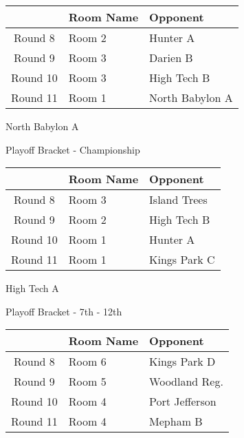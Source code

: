\documentclass{article}%
\begin{document}
\vspace*{4pt}%
%
\begin{tabularx}{\textwidth}{|c|Y|Y|}%
\hline%
&Room Name&Opponent\\%
\hline%
Round 8&Room 2&Hunter A\\%
Round 9&Room 3&Darien B\\%
Round 10&Room 3&High Tech B\\%
Round 11&Room 1&North Babylon A\\%
\hline%
\end{tabularx}%
\vspace*{80pt}%
\linebreak%
\newpage%
\begin{center}%
\begin{Huge}%
North Babylon A%
\end{Huge}%
\vspace*{12pt}%
\linebreak%
\begin{Large}%
Playoff Bracket {-} Championship%
\end{Large}%
\end{center}%
\vspace*{4pt}%
%
\begin{tabularx}{\textwidth}{|c|Y|Y|}%
\hline%
&Room Name&Opponent\\%
\hline%
Round 8&Room 3&Island Trees\\%
Round 9&Room 2&High Tech B\\%
Round 10&Room 1&Hunter A\\%
Round 11&Room 1&Kings Park C\\%
\hline%
\end{tabularx}%
\vspace*{80pt}%
\linebreak%
\newpage%
\begin{center}%
\begin{Huge}%
High Tech A%
\end{Huge}%
\vspace*{12pt}%
\linebreak%
\begin{Large}%
Playoff Bracket {-} 7th {-} 12th%
\end{Large}%
\end{center}%
\vspace*{4pt}%
%
\begin{tabularx}{\textwidth}{|c|Y|Y|}%
\hline%
&Room Name&Opponent\\%
\hline%
Round 8&Room 6&Kings Park D\\%
Round 9&Room 5&Woodland Reg.\\%
Round 10&Room 4&Port Jefferson\\%
Round 11&Room 4&Mepham B\\%
\hline%
\end{tabularx}%
\end{document}
